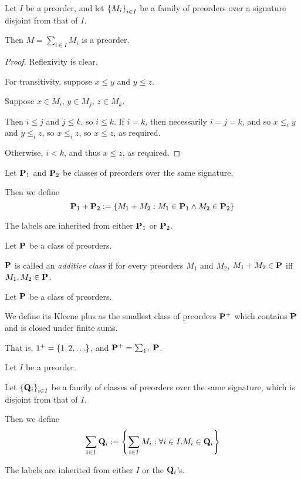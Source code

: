\begin{lemma}
  Let $I$ be a preorder, and let $\left\{ {M_i} \right\}_{i \in I}$ be a family of preorders
  over a signature disjoint from that of $I$.

  Then $M = \sum_{i \in I} M_i$ is a preorder.
\end{lemma}

\begin{proof}
  Reflexivity is clear.

  For transitivity, suppose $x \le y$ and $y \le z$.

  Suppose $x \in M_i$, $y \in M_j$, $z \in M_k$.

  Then $i \le j$ and $j \le k$, so $i \le k$.
  If $i = k$, then necessarily $i = j = k$, and so $x \le_i y$ and $y \le_i z$,
  so $x \le_i z$, so $x \le z$, as required.

  Otherwise, $i < k$, and thus $x \le z$, as required.
\end{proof}

\begin{definition}
  Let $\mathbf{P}_1$ and $\mathbf{P}_2$ be classes of preorders over the same signature.

  Then we define
  \[
    \mathbf{P}_1 + \mathbf{P}_2 := \left\{ {M_1 + M_2 : M_1 \in \mathbf{P}_1 \wedge M_2 \in \mathbf{P}_2} \right\}
  \]

  The labels are inherited from either $\mathbf{P}_1$ or $\mathbf{P}_2$.
\end{definition}

\begin{definition}
  Let $\mathbf{P}$ be a class of preorders.

  $\mathbf{P}$ is called an \emph{additive class} if for every preorders $M_1$ and $M_2$,
  $M_1 + M_2 \in \mathbf{P}$ iff $M_1, M_2 \in \mathbf{P}$.
\end{definition}

\begin{definition}
  Let $\mathbf{P}$ be a class of preorders.

  We define its Kleene plus as the smallest class of preorders $\mathbf{P}^+$ which contains $\mathbf{P}$ and is closed under
  finite sums.

  That is, $1^+ = \left\{ {1, 2, \ldots} \right\}$, and $\mathbf{P}^+ = \sum_{1^+}{\mathbf{P}}$.
\end{definition}

\begin{definition}
  Let $I$ be a preorder.

  Let $\left\{ {\mathbf{Q}_i} \right\}_{i \in I}$ be a family of classes of preorders
  over the same signature, which is disjoint from that of $I$.

  Then we define
  \[
    \sum_{i \in I}{\mathbf{Q}_i} := \left\{ {\sum_{i \in I}{M_i} : \forall i \in I. M_i \in \mathbf{Q}_i} \right\}
  \]

  The labels are inherited from either $I$ or the $\mathbf{Q}_i$'s.
\end{definition}

